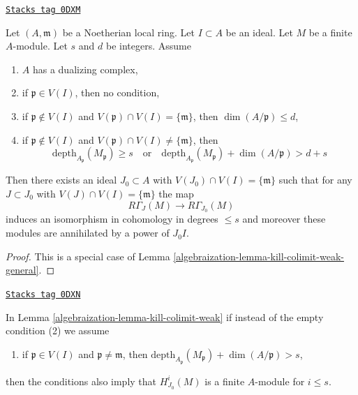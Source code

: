 \begin{lemma}
\label{algebraization-lemma-kill-colimit-weak}
\href{https://stacks.math.columbia.edu/tag/0DXM}{\texttt{Stacks tag 0DXM}}

Let $(A, \mathfrak m)$ be a Noetherian local ring.
Let $I \subset A$ be an ideal. Let $M$ be a finite $A$-module.
Let $s$ and $d$ be integers. Assume
\begin{enumerate}
\item $A$ has a dualizing complex,
\item if $\mathfrak p \in V(I)$, then no condition,
\item if $\mathfrak p \not \in V(I)$ and
$V(\mathfrak p) \cap V(I) = \{\mathfrak m\}$, then
$\dim(A/\mathfrak p) \leq d$,
\item if $\mathfrak p \not \in V(I)$ and
$V(\mathfrak p) \cap V(I) \not = \{\mathfrak m\}$, then
$$
\text{depth}_{A_\mathfrak p}(M_\mathfrak p) \geq s
\quad\text{or}\quad
\text{depth}_{A_\mathfrak p}(M_\mathfrak p) + \dim(A/\mathfrak p) > d + s
$$
\end{enumerate}
Then there exists an ideal $J_0 \subset A$ with
$V(J_0) \cap V(I) = \{\mathfrak m\}$ such that for any $J \subset J_0$ with
$V(J) \cap V(I) = \{\mathfrak m\}$ the map
$$
R\Gamma_J(M) \longrightarrow R\Gamma_{J_0}(M)
$$
induces an isomorphism in cohomology in degrees $\leq s$
and moreover these modules are annihilated by a power of $J_0I$.
\end{lemma}

\begin{proof}

This is a special case of Lemma \ref{algebraization-lemma-kill-colimit-weak-general}.
\end{proof}

\begin{lemma}
\label{algebraization-lemma-kill-colimit}
\href{https://stacks.math.columbia.edu/tag/0DXN}{\texttt{Stacks tag 0DXN}}

In Lemma \ref{algebraization-lemma-kill-colimit-weak} if instead of the empty
condition (2) we assume
\begin{enumerate}
\item[(2')] if $\mathfrak p \in V(I)$ and $\mathfrak p \not = \mathfrak m$,
then $\text{depth}_{A_\mathfrak p}(M_\mathfrak p) + \dim(A/\mathfrak p) > s$,
\end{enumerate}
then the conditions also imply that $H^i_{J_0}(M)$ is a finite
$A$-module for $i \leq s$.
\end{lemma}

